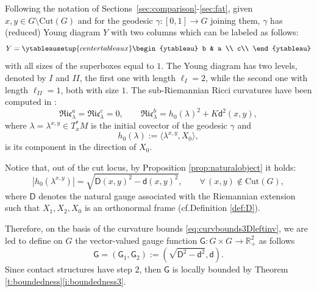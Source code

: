 \documentclass[11pt,a4paper]{article}
\theoremstyle{plain}
\theoremstyle{definition}
\theoremstyle{remark}
\numberwithin{equation}{section}
\newcommand{\R}{\mathbb{R}} %
\newcommand{\Cut}{\mathrm{Cut}}
\newcommand{\sfd}{\mathsf d}
\newcommand{\sfD}{\mathsf D}
\newcommand{\sfG}{\mathsf G}
\begin{document}
Following the notation of Sections~\ref{sec:comparison}-\ref{sec:fat}, given $x,y\in G\setminus \mathrm{Cut}(G)$ and for the geodesic $\gamma:[0,1]\to G$ joining them, $\gamma$ has (reduced) Young diagram $Y$ with two columns which can be labeled as follows:
\[
Y=\ytableausetup{centertableaux}
\begin{ytableau}
b & a \\
c\\
\end{ytableau}
\]
with all sizes of the superboxes equal to $1$. The Young diagram has two levels, denoted by $I$ and $II$, the first one with length $\ell_{I}=2$, while the second one with length $\ell_{II}=1$, both with size $1$. The sub-Riemannian Ricci curvatures have been computed in \cite{AAPL-Ricci}:
\begin{equation}\label{eq:curvbounds3Dleftinv}
\mathfrak{Ric}^a_{\lambda} =\mathfrak{Ric}^c_{\lambda} = 0, \qquad
\mathfrak{Ric}^b_{\lambda} = h_{0} (\lambda)^{2}+K \sfd^{2}(x,y), 
\end{equation}
where  $\lambda = \lambda^{x,y} \in T_x^*M$ is the initial covector of the geodesic $\gamma$ and
\begin{equation}
h_0(\lambda) := \langle \lambda^{x,y},  X_0\rangle, 
\end{equation}
is its component in the direction of $X_0$. 

Notice that, out of the cut locus, by Proposition \ref{prop:naturalobject} it holds:
\begin{equation}
|h_0(\lambda^{x,y})| = \sqrt{\sfD(x,y)^{2}-\sfd(x,y)^{2}},\qquad \forall\, (x,y)\notin \Cut(G),
\end{equation}
where $\sfD$ denotes the natural gauge associated with the Riemannian extension such that $X_{1},X_{2},X_{0}$ is an orthonormal frame (cf.\@ Definition \ref{def:D}).

Therefore, on the basis of the curvature bounds \eqref{eq:curvbounds3Dleftinv}, we are led to define on $G$ the vector-valued gauge function $\sfG:G\times G\to \R^{2}_{+}$ as follows
\begin{equation} \label{eq:g1g2}
\sfG=(\sfG_{1},\sfG_{2}):=(\sqrt{\sfD^{2}-\sfd^{2}},\sfd).
\end{equation}
Since contact structures have step $2$, then $\sfG$ is locally bounded by  Theorem \ref{t:boundedness}\ref{i:boundedness3}.
\end{document}
